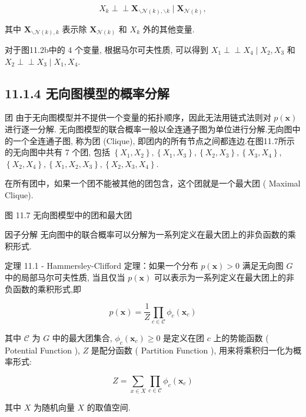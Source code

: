 \documentclass[10pt]{article}
\def\Perp{\perp\!\!\!\perp}
\begin{document}
$$
X_{k} \Perp \boldsymbol{X}_{\backslash \mathcal{N}(k), \backslash k} \mid \boldsymbol{X}_{\mathcal{N}(k)},
$$

其中 $\boldsymbol{X}_{\backslash \mathcal{N}(k), k}$ 表示除 $\boldsymbol{X}_{\mathcal{N}(k)}$ 和 $X_{k}$ 外的其他变量.

对于图11.2b中的 4 个变量, 根据马尔可夫性质, 可以得到 $X_{1} \Perp X_{4} \mid X_{2}, X_{3}$ 和 $X_{2} \Perp X_{3} \mid X_{1}, X_{4}$.

\subsection*{11.1.4 无向图模型的概率分解}
团 由于无向图模型并不提供一个变量的拓扑顺序，因此无法用链式法则对 $p(\boldsymbol{x})$ 进行逐一分解. 无向图模型的联合概率一般以全连通子图为单位进行分解.无向图中的一个全连通子图, 称为团 (Clique), 即团内的所有节点之间都连边.在图11.7所示的无向图中共有 7 个团, 包括 $\left\{X_{1}, X_{2}\right\},\left\{X_{1}, X_{3}\right\},\left\{X_{2}, X_{3}\right\},\left\{X_{3}, X_{4}\right\}$, $\left\{X_{2}, X_{4}\right\},\left\{X_{1}, X_{2}, X_{3}\right\},\left\{X_{2}, X_{3}, X_{4}\right\}$.

在所有团中，如果一个团不能被其他的团包含，这个团就是一个最大团 ( Maximal Clique).



图 11.7 无向图模型中的团和最大团

因子分解 无向图中的联合概率可以分解为一系列定义在最大团上的非负函数的乘积形式.

定理 11.1 - Hammersley-Clifford 定理：如果一个分布 $p(\boldsymbol{x})>0$ 满足无向图 $G$ 中的局部马尔可夫性质, 当且仅当 $p(\boldsymbol{x})$ 可以表示为一系列定义在最大团上的非负函数的乘积形式,即


\begin{equation*}
p(\boldsymbol{x})=\frac{1}{Z} \prod_{c \in \mathcal{C}} \phi_{c}\left(\boldsymbol{x}_{c}\right) \tag{11.16}
\end{equation*}


其中 $\mathcal{C}$ 为 $G$ 中的最大团集合, $\phi_{c}\left(\boldsymbol{x}_{c}\right) \geq 0$ 是定义在团 $c$ 上的势能函数 ( Potential Function ), $Z$ 是配分函数 ( Partition Function ), 用来将乘积归一化为概率形式:


\begin{equation*}
Z=\sum_{x \in X} \prod_{c \in \mathcal{C}} \phi_{c}\left(\boldsymbol{x}_{c}\right) \tag{11.17}
\end{equation*}


其中 $X$ 为随机向量 $X$ 的取值空间.
\end{document}
